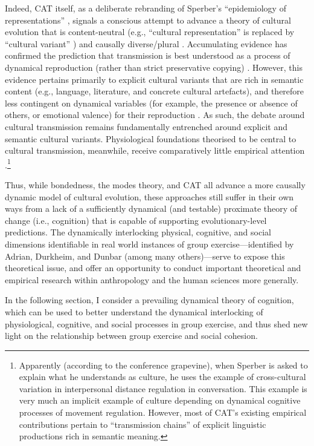 \begin{CJK}{UTF8}{gbsn}
Indeed, CAT itself, as a deliberate rebranding of Sperber's ``epidemiology of representations'' \citep{Sperber1996}, signals a conscious attempt to advance a theory of cultural evolution that is content-neutral (e.g., ``cultural representation'' is replaced by ``cultural variant'' \citep{Scott-Phillips2018}) and causally diverse/plural \citep{Claidiere2014}.  Accumulating evidence has confirmed the prediction that transmission is best understood as a process of dynamical reproduction (rather than strict preservative copying) \citep[e.g.,][]{Morin2016,Scott-Phillips2017}.  However, this evidence  pertains primarily to explicit cultural variants that are rich in semantic content (e.g., language, literature, and concrete cultural artefacts), and therefore less contingent on dynamical variables (for example, the presence or absence of others, or emotional valence) for their reproduction \citep[15]{Ramstead2016}.
As such, the debate around cultural transmission remains fundamentally entrenched around explicit and semantic cultural variants. Physiological foundations theorised to be central to cultural transmission, meanwhile, receive comparatively little empirical attention \citep{Ramstead2016,Lerique2016}.\footnote{Apparently (according to the conference grapevine), when Sperber is asked to explain what he understands as culture, he uses the example of cross-cultural variation in interpersonal distance regulation in conversation.  This example is very much an implicit example of culture depending on dynamical cognitive processes of movement regulation.  However, most of CAT's existing empirical contributions pertain to ``transmission chains'' of explicit linguistic productions rich in semantic meaning.}

Thus, while bondedness, the modes theory, and CAT all advance a more causally dynamic model of cultural evolution, these approaches still suffer in their own ways from a lack of a sufficiently dynamical (and testable) proximate theory of change (i.e., cognition) that is capable of supporting evolutionary-level predictions.  The dynamically interlocking physical, cognitive, and social dimensions identifiable in real world instances of group exercise---identified by Adrian, Durkheim, and Dunbar (among many others)---serve to expose this theoretical issue, and offer an opportunity to conduct important theoretical and empirical research within anthropology and the human sciences more generally.

In the following section, I consider a prevailing dynamical theory of cognition, which can be used to better understand the dynamical interlocking of physiological, cognitive, and social processes in group exercise, and thus shed new light on the relationship between group exercise and social cohesion.


\end{CJK}
